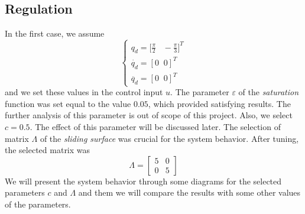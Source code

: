 \documentclass[a4paper]{article}
\begin{document}
\subsection{Regulation}
In the first case, we assume 
$$
    \begin{cases}
        q_d = \big[ \frac{\pi}{2} \;\;\; -\frac{\pi}{3} \big]^T \\
        \dot{q_d} = [0 \;\; 0]^T \\
        \ddot{q_d} = [0 \;\; 0]^T
    \end{cases}
$$
and we set these values in the control input $u$. The parameter $\varepsilon$ of the \textit{saturation} function was 
set equal to the value $0.05$, which provided satisfying results. The further analysis of this parameter is out of scope 
of this project. Also, we select $c = 0.5$. The effect of this parameter will be discussed later.
The selection of matrix $\Lambda$ of the \textit{sliding surface} was crucial for the system behavior. 
After tuning, the selected matrix was 
$$
    \Lambda = \begin{bmatrix}
        5 & 0 \\
        0 & 5
    \end{bmatrix}
$$
We will present the system behavior through some diagrams for the selected parameters $c$ and $\Lambda$ and them we will compare 
the results with some other values of the parameters.
\end{document}
